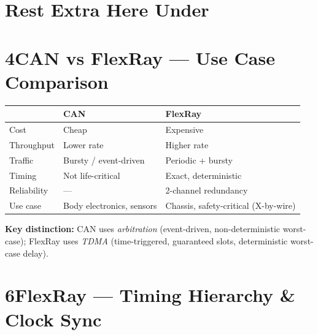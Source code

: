 \documentclass[10pt,a4paper]{article}
\begin{document}
\section{Rest Extra Here Under}
\section*{4\quad CAN vs FlexRay --- Use Case Comparison}

\vspace{2pt}
\begin{tabular}{@{}lll@{}}
\toprule
& \textbf{CAN} & \textbf{FlexRay} \\\midrule
Cost        & Cheap                    & Expensive \\
Throughput  & Lower rate               & Higher rate \\
Traffic     & Bursty / event-driven    & Periodic + bursty \\
Timing      & Not life-critical        & Exact, deterministic \\
Reliability & ---                      & 2-channel redundancy \\
Use case    & Body electronics, sensors & Chassis, safety-critical (X-by-wire) \\
\bottomrule
\end{tabular}

\begin{notebox}
\small \textbf{Key distinction:} CAN uses \emph{arbitration} (event-driven, non-deterministic worst-case);
FlexRay uses \emph{TDMA} (time-triggered, guaranteed slots, deterministic worst-case delay).
\end{notebox}
\section*{6\quad FlexRay --- Timing Hierarchy \& Clock Sync}
\end{document}
